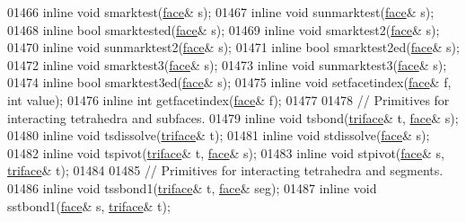 \begin{DoxyCode}
01466   \textcolor{keyword}{inline} \textcolor{keywordtype}{void} smarktest(\hyperlink{classtetgenmesh_1_1face}{face}& s);
01467   \textcolor{keyword}{inline} \textcolor{keywordtype}{void} sunmarktest(\hyperlink{classtetgenmesh_1_1face}{face}& s);
01468   \textcolor{keyword}{inline} \textcolor{keywordtype}{bool} smarktested(\hyperlink{classtetgenmesh_1_1face}{face}& s);
01469   \textcolor{keyword}{inline} \textcolor{keywordtype}{void} smarktest2(\hyperlink{classtetgenmesh_1_1face}{face}& s);
01470   \textcolor{keyword}{inline} \textcolor{keywordtype}{void} sunmarktest2(\hyperlink{classtetgenmesh_1_1face}{face}& s);
01471   \textcolor{keyword}{inline} \textcolor{keywordtype}{bool} smarktest2ed(\hyperlink{classtetgenmesh_1_1face}{face}& s);
01472   \textcolor{keyword}{inline} \textcolor{keywordtype}{void} smarktest3(\hyperlink{classtetgenmesh_1_1face}{face}& s);
01473   \textcolor{keyword}{inline} \textcolor{keywordtype}{void} sunmarktest3(\hyperlink{classtetgenmesh_1_1face}{face}& s);
01474   \textcolor{keyword}{inline} \textcolor{keywordtype}{bool} smarktest3ed(\hyperlink{classtetgenmesh_1_1face}{face}& s);
01475   \textcolor{keyword}{inline} \textcolor{keywordtype}{void} setfacetindex(\hyperlink{classtetgenmesh_1_1face}{face}& f, \textcolor{keywordtype}{int} value);
01476   \textcolor{keyword}{inline} \textcolor{keywordtype}{int}  getfacetindex(\hyperlink{classtetgenmesh_1_1face}{face}& f);
01477 
01478   \textcolor{comment}{// Primitives for interacting tetrahedra and subfaces.}
01479   \textcolor{keyword}{inline} \textcolor{keywordtype}{void} tsbond(\hyperlink{classtetgenmesh_1_1triface}{triface}& t, \hyperlink{classtetgenmesh_1_1face}{face}& s);
01480   \textcolor{keyword}{inline} \textcolor{keywordtype}{void} tsdissolve(\hyperlink{classtetgenmesh_1_1triface}{triface}& t);
01481   \textcolor{keyword}{inline} \textcolor{keywordtype}{void} stdissolve(\hyperlink{classtetgenmesh_1_1face}{face}& s);
01482   \textcolor{keyword}{inline} \textcolor{keywordtype}{void} tspivot(\hyperlink{classtetgenmesh_1_1triface}{triface}& t, \hyperlink{classtetgenmesh_1_1face}{face}& s);
01483   \textcolor{keyword}{inline} \textcolor{keywordtype}{void} stpivot(\hyperlink{classtetgenmesh_1_1face}{face}& s, \hyperlink{classtetgenmesh_1_1triface}{triface}& t);
01484 
01485   \textcolor{comment}{// Primitives for interacting tetrahedra and segments.}
01486   \textcolor{keyword}{inline} \textcolor{keywordtype}{void} tssbond1(\hyperlink{classtetgenmesh_1_1triface}{triface}& t, \hyperlink{classtetgenmesh_1_1face}{face}& seg);
01487   \textcolor{keyword}{inline} \textcolor{keywordtype}{void} sstbond1(\hyperlink{classtetgenmesh_1_1face}{face}& s, \hyperlink{classtetgenmesh_1_1triface}{triface}& t);

\end{DoxyCode}
